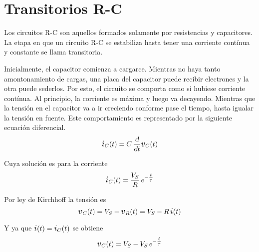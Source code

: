 \documentclass[a5paper,12pt,twoside]{book}
\begin{document}
\renewcommand{\iu}{\hspace{0.5mm}\mathrm{j}\mkern1mu}
\renewcommand{\voltage}{\scale{1.2}{v}}
\renewcommand{\current}{\scale{1.2}{i}}


\section{Transitorios R-C}

Los circuitos R-C son aquellos formados solamente por resistencias y capacitores.
La etapa en que un circuito R-C se estabiliza hasta tener una corriente contínua y constante se llama transitoria.

\begin{center}
    \def\svgwidth{0.5\linewidth}
    
\end{center}

Inicialmente, el capacitor comienza a cargarce.
Mientras no haya tanto amontonamiento de cargas, una placa del capacitor puede recibir electrones y la otra puede sederlos.
Por esto, el circuito se comporta como si hubiese corriente contínua.
Al principio, la corriente es máxima y luego va decayendo.
Mientras que la tensión en el capacitor va a ir creciendo conforme pase el tiempo, hasta igualar la tensión en fuente.
Este comportamiento es representado por la siguiente ecuación diferencial.
\begin{equation*}
    \current_C(t) = C \, \frac{\dif}{\dif t} \voltage_C(t)
\end{equation*}

Cuya solución es para la corriente
\begin{equation*}
    \current_C(t) = \frac{V_S}{R} \, e^{-\tfrac{t}{\tau}}
\end{equation*}

\begin{center}
    \def\svgwidth{0.8\linewidth}
    
\end{center}

Por ley de Kirchhoff la tensión es
\begin{equation*}
    \voltage_C(t) = V_S - \voltage_R(t) = V_S - R \, \current(t)
\end{equation*}

Y ya que $\current(t) = \current_C(t)$ se obtiene
\begin{equation*}
    \voltage_C(t) = V_S - V_S \, e^{-\tfrac{t}{\tau}}
\end{equation*}
\end{document}
